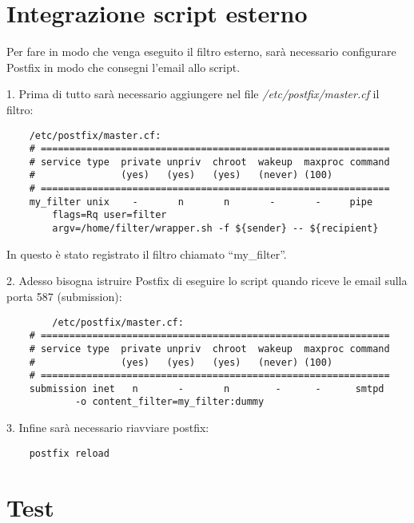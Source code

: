     \section{Integrazione script esterno}
    Per fare in modo che venga eseguito il filtro esterno, sarà necessario configurare Postfix in modo
    che consegni l'email allo script.
    
    1. Prima di tutto sarà necessario aggiungere nel file \textit{/etc/postfix/master.cf} il filtro:

    \begin{verbatim}
    /etc/postfix/master.cf:
    # =============================================================
    # service type  private unpriv  chroot  wakeup  maxproc command
    #               (yes)   (yes)   (yes)   (never) (100)
    # =============================================================
    my_filter unix	  -	      n	      n	      -	      -	    pipe
	    flags=Rq user=filter 
        argv=/home/filter/wrapper.sh -f ${sender} -- ${recipient}
    \end{verbatim}
    In questo è stato registrato il filtro chiamato ``my\_filter''.
    
    2. Adesso bisogna istruire Postfix di eseguire lo script quando riceve le email sulla porta 587 (submission):

    \begin{verbatim}
        /etc/postfix/master.cf:
    # =============================================================
    # service type  private unpriv  chroot  wakeup  maxproc command
    #               (yes)   (yes)   (yes)   (never) (100)
    # =============================================================
    submission inet   n       -       n        -      -      smtpd
            -o content_filter=my_filter:dummy  
    \end{verbatim}
    
    3. Infine sarà necessario riavviare postfix:

    \begin{verbatim}
    postfix reload 
    \end{verbatim}
    

    \section{Test}
